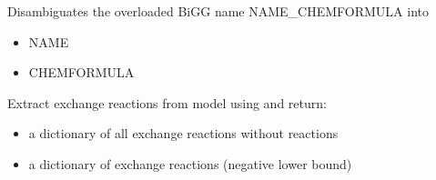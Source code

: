 \documentclass[letterpaper,10pt,english]{sphinxmanual}
\begin{document}

\begin{fulllineitems}
\label{\detokenize{modules_doc:cbmpy.CBTools.processBiGGchemFormula}}
\pysigstartsignatures
{}
\pysigstopsignatures
\sphinxAtStartPar
Disambiguates the overloaded BiGG name NAME\_CHEMFORMULA into
\begin{itemize}
\item {} 
\sphinxAtStartPar
{} NAME

\item {} 
\sphinxAtStartPar
{} CHEMFORMULA

\end{itemize}

\end{fulllineitems}


\begin{fulllineitems}
\label{\detokenize{modules_doc:cbmpy.CBTools.processExchangeReactions}}
\pysigstartsignatures
{}
\pysigstopsignatures
\sphinxAtStartPar
Extract exchange reactions from model using  and return:
\begin{itemize}
\item {} 
\sphinxAtStartPar
a dictionary of all exchange reactions without  reactions

\item {} 
\sphinxAtStartPar
a dictionary of  exchange reactions (negative lower bound)

\end{itemize}

\end{fulllineitems}

\end{document}
